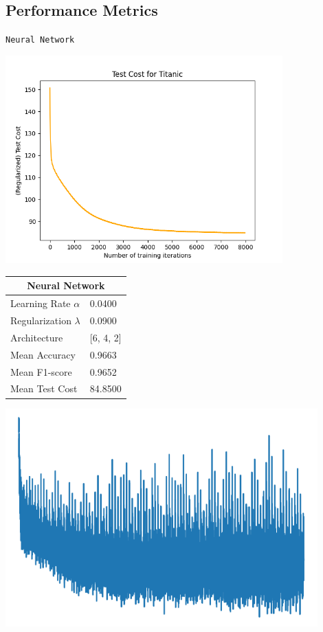 \documentclass{article}
\begin{document}
\subsection*{Performance Metrics}
\begin{center}
    \texttt{Neural Network}

    \includegraphics*[width=0.8\textwidth]{./src/figures/Titanic-test-cost.png}
\end{center}

\begin{minipage}{0.49\textwidth}
    \centering

    \begin{tabular}{ll}
        \toprule
        \multicolumn{2}{c}{Neural Network} \\
        \midrule
        Learning Rate $\alpha$ & 0.0400 \\
        Regularization $\lambda$ & 0.0900 \\
        Architecture & [6, 4, 2] \\
        Mean Accuracy & 0.9663 \\
        Mean F1-score & 0.9652 \\
        Mean Test Cost & 84.8500 \\
        \bottomrule
    \end{tabular}
    
\end{minipage}
\hfill
\begin{minipage}{0.49\textwidth}
    \centering
    \includegraphics*[width=0.9\textwidth]{./src/figures/Titanic_train_cost.png}
\end{minipage}
\end{document}

